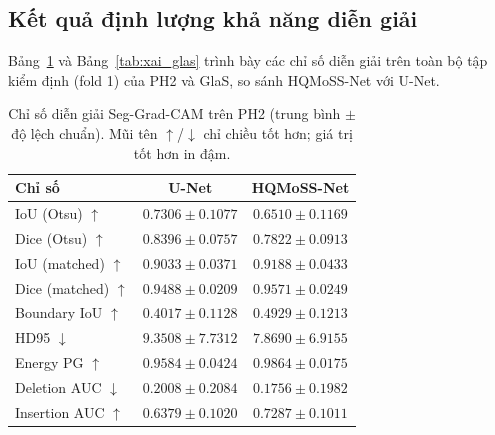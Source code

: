 \FloatBarrier

\subsection{Kết quả định lượng khả năng diễn giải}
Bảng~\ref{tab:xai_ph2} và Bảng~\ref{tab:xai_glas} trình bày các chỉ số diễn giải trên toàn bộ tập kiểm định (fold 1) của PH2 và GlaS, so sánh HQMoSS-Net với U-Net.

\begin{table}[h]
\centering
\caption{Chỉ số diễn giải Seg-Grad-CAM trên PH2 (trung bình $\pm$ độ lệch chuẩn). Mũi tên $\uparrow$/$\downarrow$ chỉ chiều tốt hơn; giá trị tốt hơn in đậm.}
\label{tab:xai_ph2}
\begin{tabular}{|l|c|c|}
\hline
\textbf{Chỉ số} & \textbf{U-Net} & \textbf{HQMoSS-Net} \\ \hline
IoU (Otsu) $\uparrow$      & $\mathbf{0.7306 \pm 0.1077}$ & $0.6510 \pm 0.1169$ \\ \hline
Dice (Otsu) $\uparrow$     & $\mathbf{0.8396 \pm 0.0757}$ & $0.7822 \pm 0.0913$ \\ \hline
IoU (matched) $\uparrow$   & $0.9033 \pm 0.0371$ & $\mathbf{0.9188 \pm 0.0433}$ \\ \hline
Dice (matched) $\uparrow$  & $0.9488 \pm 0.0209$ & $\mathbf{0.9571 \pm 0.0249}$ \\ \hline
Boundary IoU $\uparrow$    & $0.4017 \pm 0.1128$ & $\mathbf{0.4929 \pm 0.1213}$ \\ \hline
HD95 $\downarrow$          & $9.3508 \pm 7.7312$ & $\mathbf{7.8690 \pm 6.9155}$ \\ \hline
Energy PG $\uparrow$       & $0.9584 \pm 0.0424$ & $\mathbf{0.9864 \pm 0.0175}$ \\ \hline
Deletion AUC $\downarrow$  & $0.2008 \pm 0.2084$ & $\mathbf{0.1756 \pm 0.1982}$ \\ \hline
Insertion AUC $\uparrow$   & $0.6379 \pm 0.1020$ & $\mathbf{0.7287 \pm 0.1011}$ \\ \hline
\end{tabular}
\end{table}

